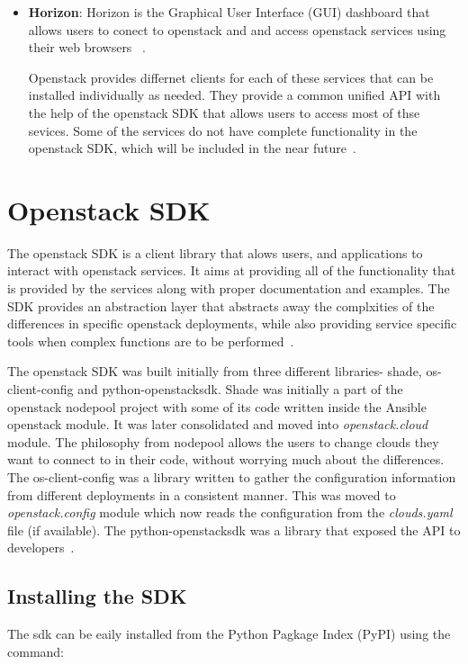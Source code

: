 \begin{itemize}
\item \textbf{Horizon}: Horizon is the Graphical User Interface (GUI) dashboard
that allows users to conect to openstack and and access openstack
services using their web browsers~\cite{hid-sp18-503-oracle-openstack}
\cite{hid-sp18-503-horizon}.

Openstack provides differnet clients for each of these services that
can be installed individually as needed. They provide a common unified
API with the help of the openstack SDK that allows users to access
most of thse sevices. Some of the services do not have complete
functionality in the openstack SDK, which will be included in the near
future~\cite{hid-sp18-503-openstack-sdk}.
\end{itemize}

\section{Openstack SDK}
The openstack SDK is a client library that alows users, and
applications to interact with openstack services. It aims at providing
all of the functionality that is provided by the services along with
proper documentation and examples. The SDK provides an abstraction
layer that abstracts away the complxities of the differences in
specific openstack deployments, while also providing service specific
tools when complex functions are to be
performed~\cite{hid-sp18-503-openstack-sdk-history}.

The openstack SDK was built initially from three different libraries-
shade, os-client-config and python-openstacksdk. Shade was initially a
part of the openstack nodepool project with some of its code written
inside the Ansible openstack module. It was later consolidated and
moved into \emph{openstack.cloud} module. The philosophy from nodepool
allows the users to change clouds they want to connect to in their
code, without worrying much about the differences. The
os-client-config was a library written to gather the configuration
information from different deployments in a consistent manner. This
was moved to \emph{openstack.config} module which now reads the
configuration from the \emph{clouds.yaml} file (if available). The
python-openstacksdk was a library that exposed the API to
developers~\cite{hid-sp18-503-openstack-sdk-history}.

\subsection{Installing the SDK}
The sdk can be eaily installed from the Python Pagkage Index (PyPI)
using the command:

